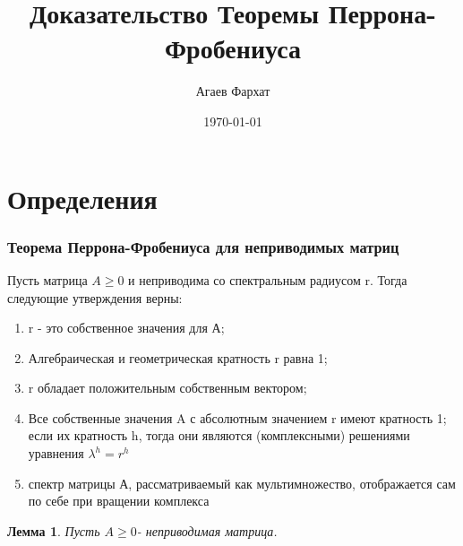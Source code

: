 \documentclass{article} %
\author{Агаев Фархат}
\title{Доказательство Теоремы Перрона-Фробениуса}
\date{\today}
\newtheorem{lemma}[theorem]{Лемма}
\begin{document}


\maketitle

\section*{Определения}

\subsubsection*{Теорема Перрона-Фробениуса для неприводимых матриц}
    Пусть матрица $A \geq 0$ и неприводима со спектральным радиусом r. 
    Тогда следующие утверждения верны:
    \begin{enumerate}
        \item r - это собственное значения для А;
        \item Алгебраическая и геометрическая кратность r равна 1;
        \item r обладает положительным собственным вектором;
        \item Все собственные значения A с абсолютным значением r имеют кратность 1; 
        если их кратность h, тогда они являются
        (комплексными) решениями уравнения $\lambda^h = r^h$
        \item спектр матрицы А, рассматриваемый как мультимножество, 
        отображается сам по себе при вращении комплекса
    
    \end{enumerate}



\begin{lemma}
    Пусть $A \geq 0$- неприводимая матрица. 
\end{lemma}
\end{document}
